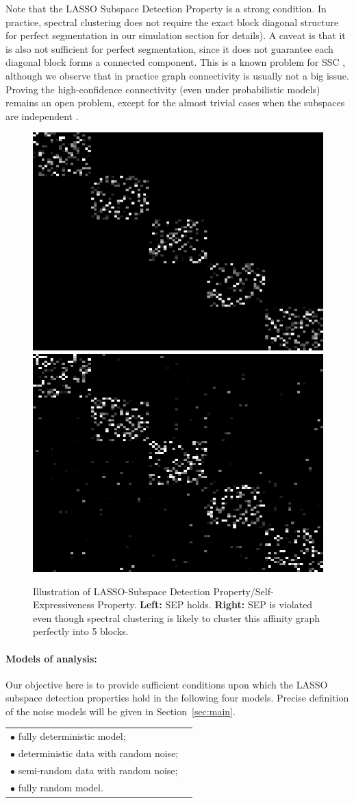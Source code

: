 \documentclass{ctexart}
\begin{document}
Note that the LASSO Subspace Detection Property is a strong condition. In practice, spectral clustering does not require the exact block diagonal structure for perfect segmentation in our simulation section for details). A caveat is that it is also not sufficient for perfect segmentation, since it does not guarantee each diagonal block forms a connected component. This is a known problem for SSC \cite{nasihatkon2011graph}, although we observe that in practice graph connectivity is usually not a big issue. Proving the high-confidence connectivity (even under probabilistic models) remains an open problem, except for the almost trivial cases when the subspaces are independent \cite{liu2013LRR, wang2013provable}.

\begin{figure}
  \centering
  \includegraphics[width=0.35\linewidth]{pics/SEP.png}
  \includegraphics[width=0.35\linewidth]{pics/ViolateSEP.png}\\
  \caption{Illustration of LASSO-Subspace Detection Property/Self-Expressiveness Property. \textbf{Left:} SEP holds. \textbf{Right:} SEP is violated even though spectral clustering is likely to cluster this affinity graph perfectly into 5 blocks.}\label{fig:SEP}
\end{figure}

\paragraph{Models of analysis: }
Our objective here is to provide sufficient conditions upon which the LASSO subspace detection properties hold in the following four models. Precise definition of the noise models will be given in Section~\ref{sec:main}.

\begin{tabular}{ll}
  $\bullet$ fully deterministic model;\\
  $\bullet$ deterministic data with random noise;\\
  $\bullet$ semi-random data with random noise;\\
  $\bullet$ fully random model.
\end{tabular}
\end{document}
